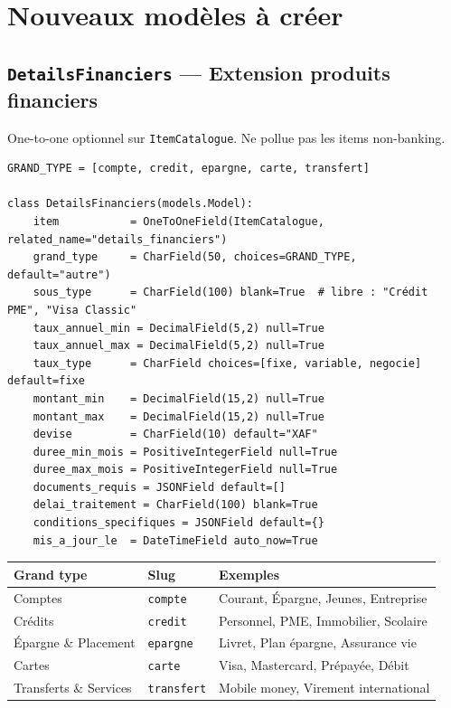 \documentclass[11pt,a4paper]{article}
\newcommand{\slug}[1]{\texttt{\color{AGTDark}#1}}
\begin{document}
\section{Nouveaux modèles à créer}

\subsection{\slug{DetailsFinanciers} — Extension produits financiers}

One-to-one optionnel sur \slug{ItemCatalogue}. Ne pollue pas les items non-banking.

\begin{lstlisting}
GRAND_TYPE = [compte, credit, epargne, carte, transfert]

class DetailsFinanciers(models.Model):
    item           = OneToOneField(ItemCatalogue, related_name="details_financiers")
    grand_type     = CharField(50, choices=GRAND_TYPE, default="autre")
    sous_type      = CharField(100) blank=True  # libre : "Crédit PME", "Visa Classic"
    taux_annuel_min = DecimalField(5,2) null=True
    taux_annuel_max = DecimalField(5,2) null=True
    taux_type      = CharField choices=[fixe, variable, negocie]  default=fixe
    montant_min    = DecimalField(15,2) null=True
    montant_max    = DecimalField(15,2) null=True
    devise         = CharField(10) default="XAF"
    duree_min_mois = PositiveIntegerField null=True
    duree_max_mois = PositiveIntegerField null=True
    documents_requis = JSONField default=[]
    delai_traitement = CharField(100) blank=True
    conditions_specifiques = JSONField default={}
    mis_a_jour_le  = DateTimeField auto_now=True
\end{lstlisting}

\begin{center}
\begin{tabularx}{\textwidth}{llX}
\toprule
\textbf{Grand type} & \textbf{Slug} & \textbf{Exemples} \\
\midrule
Comptes & \slug{compte} & Courant, Épargne, Jeunes, Entreprise \\
Crédits & \slug{credit} & Personnel, PME, Immobilier, Scolaire \\
Épargne \& Placement & \slug{epargne} & Livret, Plan épargne, Assurance vie \\
Cartes & \slug{carte} & Visa, Mastercard, Prépayée, Débit \\
Transferts \& Services & \slug{transfert} & Mobile money, Virement international \\
\bottomrule
\end{tabularx}
\end{center}
\end{document}
